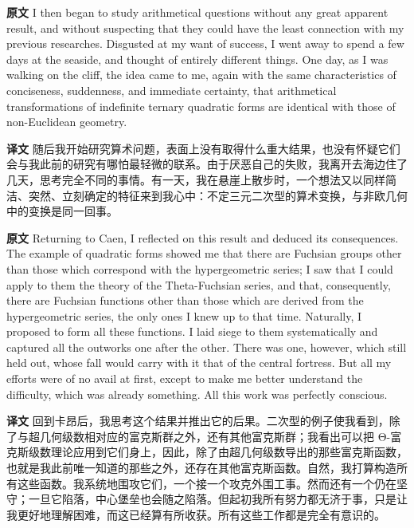 \documentclass[UTF8]{ctexart}
\newenvironment{english}{\par\small\noindent\textbf{原文}\quad\ignorespaces}{\par}
\newenvironment{zhtranslation}{\par\noindent\textbf{译文}\quad\ignorespaces}{\par\vspace{0.35em}}
\begin{document}
\begin{english}
I then began to study arithmetical questions without any great apparent result, and without suspecting that they could have the least connection with my previous researches. Disgusted at my want of success, I went away to spend a few days at the seaside, and thought of entirely different things. One day, as I was walking on the cliff, the idea came to me, again with the same characteristics of conciseness, suddenness, and immediate certainty, that arithmetical transformations of indefinite ternary quadratic forms are identical with those of non-Euclidean geometry.
\end{english}
\begin{zhtranslation}
随后我开始研究算术问题，表面上没有取得什么重大结果，也没有怀疑它们会与我此前的研究有哪怕最轻微的联系。由于厌恶自己的失败，我离开去海边住了几天，思考完全不同的事情。有一天，我在悬崖上散步时，一个想法又以同样简洁、突然、立刻确定的特征来到我心中：不定三元二次型的算术变换，与非欧几何中的变换是同一回事。\end{zhtranslation}

\begin{english}
Returning to Caen, I reflected on this result and deduced its consequences. The example of quadratic forms showed me that there are Fuchsian groups other than those which correspond with the hypergeometric series; I saw that I could apply to them the theory of the Theta-Fuchsian series, and that, consequently, there are Fuchsian functions other than those which are derived from the hypergeometric series, the only ones I knew up to that time. Naturally, I proposed to form all these functions. I laid siege to them systematically and captured all the outworks one after the other. There was one, however, which still held out, whose fall would carry with it that of the central fortress. But all my efforts were of no avail at first, except to make me better understand the difficulty, which was already something. All this work was perfectly conscious.
\end{english}
\begin{zhtranslation}
回到卡昂后，我思考这个结果并推出它的后果。二次型的例子使我看到，除了与超几何级数相对应的富克斯群之外，还有其他富克斯群；我看出可以把 Θ-富克斯级数理论应用到它们身上，因此，除了由超几何级数导出的那些富克斯函数，也就是我此前唯一知道的那些之外，还存在其他富克斯函数。自然，我打算构造所有这些函数。我系统地围攻它们，一个接一个攻克外围工事。然而还有一个仍在坚守；一旦它陷落，中心堡垒也会随之陷落。但起初我所有努力都无济于事，只是让我更好地理解困难，而这已经算有所收获。所有这些工作都是完全有意识的。\end{zhtranslation}
\end{document}
